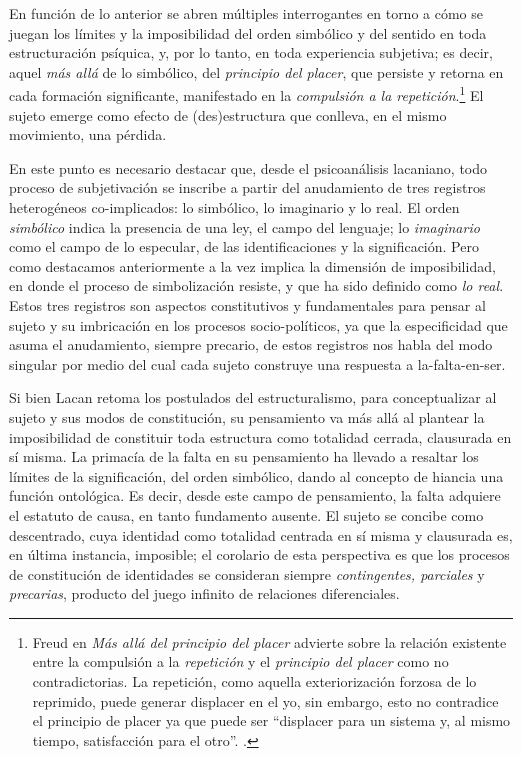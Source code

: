 En función de lo anterior se abren múltiples interrogantes en torno a cómo se juegan los límites y la imposibilidad del orden simbólico y del sentido en toda estructuración psíquica, y, por lo tanto, en toda experiencia subjetiva; es decir, aquel \emph{más allá} de lo simbólico, del \emph{principio del placer}, que persiste y retorna en cada formación significante, manifestado en la \emph{compulsión a la repetición}.\footnote{Freud en \emph{Más allá del principio del placer} advierte sobre la relación existente entre la compulsión a la \emph{repetición} y el \emph{principio del placer} como no contradictorias. La repetición, como aquella exteriorización forzosa de lo reprimido, puede generar displacer en el yo, sin embargo, esto no contradice el principio de placer ya que puede ser \enquote{displacer para un sistema y, al mismo tiempo, satisfacción para el otro}. \cite[][20]{@7104-FREUD1984}.} El sujeto emerge como efecto de (des)estructura que conlleva, en el mismo movimiento, una pérdida.


En este punto es necesario destacar que, desde el psicoanálisis lacaniano, todo proceso de subjetivación se inscribe a partir del anudamiento de tres registros heterogéneos co-implicados: lo simbólico, lo imaginario y lo real. El orden \emph{simbólico} indica la presencia de una ley, el campo del lenguaje; lo \emph{imaginario} como el campo de lo especular, de las identificaciones y la significación. Pero como destacamos anteriormente a la vez implica la dimensión de imposibilidad, en donde el proceso de simbolización resiste, y que ha sido definido como \emph{lo real}. Estos tres registros son aspectos constitutivos y fundamentales para pensar al sujeto y su imbricación en los procesos socio-políticos, ya que la especificidad que asuma el anudamiento, siempre precario, de estos registros nos habla del modo singular por medio del cual cada sujeto construye una respuesta a la-falta-en-ser.

Si bien Lacan retoma los postulados del estructuralismo, para conceptualizar al sujeto y sus modos de constitución, su pensamiento va más allá al plantear la imposibilidad de constituir toda estructura como totalidad cerrada, clausurada en sí misma. La primacía de la falta en su pensamiento ha llevado a resaltar los límites de la significación, del orden simbólico, dando al concepto de hiancia una función ontológica. Es decir, desde este campo de pensamiento, la falta adquiere el estatuto de causa, en tanto fundamento ausente. El sujeto se concibe como descentrado, cuya identidad como totalidad centrada en sí misma y clausurada es, en última instancia, imposible; el corolario de esta perspectiva es que los procesos de constitución de identidades se consideran siempre \emph{contingentes, parciales} y \emph{precarias}, producto del juego infinito de relaciones diferenciales.



